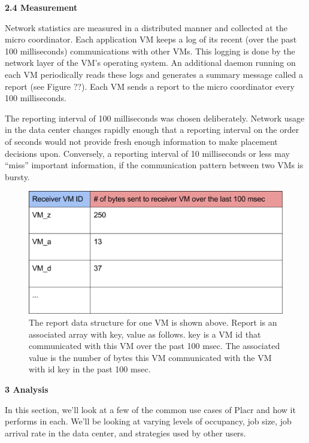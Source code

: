 \documentclass[11pt]{article}
\begin{document}
\Large{\textbf{2.4 Measurement}}
\normalsize

Network statistics are measured in a distributed manner and collected at the micro coordinator.  Each application VM keeps a log of its recent (over the past 100 milliseconds) communications with other VMs.  This logging is done by the network layer of the VM’s operating system.  An additional daemon running on each VM periodically reads these logs and generates a summary message called a report (see Figure ??).  Each VM sends a report to the micro coordinator every 100 milliseconds.

The reporting interval of 100 milliseconds was chosen deliberately.  Network usage in the data center changes rapidly enough that a reporting interval on the order of seconds would not provide fresh enough information to make placement decisions upon.  Conversely, a reporting interval of 10 milliseconds or less may “miss” important information, if the communication pattern between two VMs is bursty.

\begin{figure}[h!]
  \centering
\includegraphics[scale=0.65]{measurement.png}

 \caption{The report data structure for one VM is shown above. Report is an associated array with key, value as follows. key is a VM id that communicated with this VM over the past 100 msec. The associated value is the number of bytes this VM communicated with the VM with id key in the past 100 msec.}

\end{figure}

\FloatBarrier
\LARGE{\textbf{3 Analysis}}

\normalsize

In this section, we’ll look at a few of the common use cases of Placr and how it performs in each.  We’ll be looking at varying levels of occupancy, job size, job arrival rate in the data center, and strategies used by other users.
\end{document}
